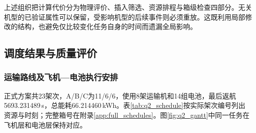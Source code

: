 \documentclass[withoutpreface,colorprint]{format}
\numberwithin{equation}{section}
\numberwithin{figure}{section}
\numberwithin{table}{section}
\begin{document}
上述组织把计算代价分为物理评价、插入筛选、资源排程与箱级检查四部分。无关机型的已验证属性可以保留，受影响机型的后续事件则必须重放。这既利用局部修改的结构，也避免仅比较变化任务自身的时间而遗漏全局影响。


\subsection{调度结果与质量评价}
\subsubsection{运输路线及飞机—电池执行安排}
正式方案共23架次，A/B/C为11/6/6，使用8架运输机和14组电池，最后返航5693.231489\,s，总能耗66.214460\,kWh。表\ref{tab:q2_schedule}按实际架次编号列出资源与时刻；完整箱号在附录\ref{app:full_schedules}。图\ref{fig:q2_gantt}中同一任务在飞机层和电池层保持对应。
\end{document}
